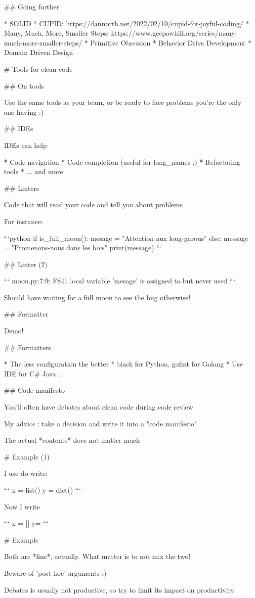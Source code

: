 ## Going further

* SOLID
* CUPID: https://dannorth.net/2022/02/10/cupid-for-joyful-coding/
* Many, Much, More, Smaller Steps: https://www.geepawhill.org/series/many-much-more-smaller-steps/
* Primitive Obsession
* Behavior Drive Development
* Domain Driven Design

# Tools for clean code

## On tools

Use the same tools as your team, or be ready to face
problems you're the only one having :)

## IDEs

IDEs can help

* Code navigation
* Code completion (useful for long_names ;)
* Refactoring tools
* ... and more

## Linters

Code that will read your code and tell you about problems

For instance:

```python
if is_full_moon():
    mesage = "Attention aux loug-garous"
else:
    message = "Promenons-nous dans les bois"
print(message)
```

## Linter (2)

```
moon.py:7:9: F841 local variable 'mesage' is assigned to but never used
```

Should have waiting for a full moon to see the bug otherwise!

## Formatter

Demo!

## Formatters

* The less configuration the better
* black for Python, gofmt for Golang
* Use IDE for C# Java
...

## Code manifesto

You'll often have debates about clean code during code review

My advice : take a decision and write it into a "code manifesto"

The actual *contents* does not matter much

# Example (1)

I use do write:

```
x = list()
y = dict()
```

Now I write

```
x = []
y= {}
```

# Example

Both are *fine*, actually. What matter is to not mix the two!

Beware of 'post-hoc' arguments ;)

Debates is usually not productive, so try to limit its impact
on productivity
